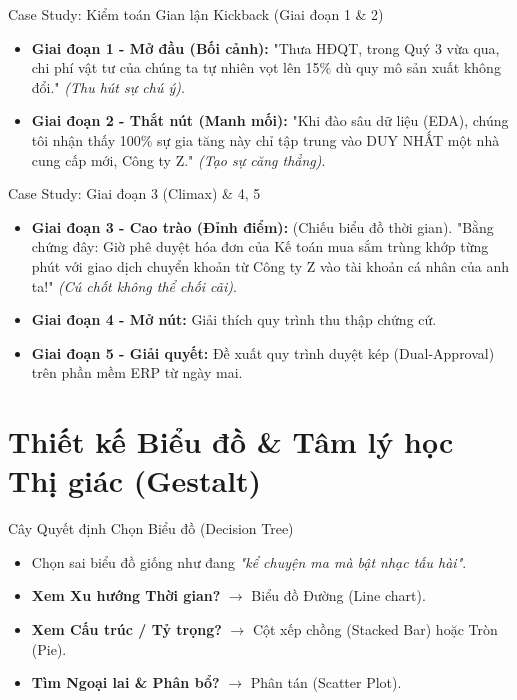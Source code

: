 \documentclass[aspectratio=169,12pt]{beamer}
\begin{document}
\begin{frame}{Case Study: Kiểm toán Gian lận Kickback (Giai đoạn 1 \& 2)}
    \begin{itemize}
        \item \textbf{Giai đoạn 1 - Mở đầu (Bối cảnh):} "Thưa HĐQT, trong Quý 3 vừa qua, chi phí vật tư của chúng ta tự nhiên vọt lên 15\% dù quy mô sản xuất không đổi." \textit{(Thu hút sự chú ý)}.
        \item \textbf{Giai đoạn 2 - Thắt nút (Manh mối):} "Khi đào sâu dữ liệu (EDA), chúng tôi nhận thấy 100\% sự gia tăng này chỉ tập trung vào DUY NHẤT một nhà cung cấp mới, Công ty Z." \textit{(Tạo sự căng thẳng)}.
    \end{itemize}
\end{frame}

\begin{frame}{Case Study: Giai đoạn 3 (Climax) \& 4, 5}
    \begin{itemize}
        \item \textbf{Giai đoạn 3 - Cao trào (Đỉnh điểm):} (Chiếu biểu đồ thời gian). "Bằng chứng đây: Giờ phê duyệt hóa đơn của Kế toán mua sắm trùng khớp từng phút với giao dịch chuyển khoản từ Công ty Z vào tài khoản cá nhân của anh ta!" \textit{(Cú chốt không thể chối cãi)}.
        \item \textbf{Giai đoạn 4 - Mở nút:} Giải thích quy trình thu thập chứng cứ.
        \item \textbf{Giai đoạn 5 - Giải quyết:} Đề xuất quy trình duyệt kép (Dual-Approval) trên phần mềm ERP từ ngày mai.
    \end{itemize}
\end{frame}


\section{Thiết kế Biểu đồ \& Tâm lý học Thị giác (Gestalt)}
\begin{frame}
    \tableofcontents[currentsection]
\end{frame}

\begin{frame}{Cây Quyết định Chọn Biểu đồ (Decision Tree)}
    \begin{itemize}
        \item Chọn sai biểu đồ giống như đang \textit{"kể chuyện ma mà bật nhạc tấu hài"}.
        \item \textbf{Xem Xu hướng Thời gian?} $\rightarrow$ Biểu đồ Đường (Line chart).
        \item \textbf{Xem Cấu trúc / Tỷ trọng?} $\rightarrow$ Cột xếp chồng (Stacked Bar) hoặc Tròn (Pie).
        \item \textbf{Tìm Ngoại lai \& Phân bổ?} $\rightarrow$ Phân tán (Scatter Plot).
    \end{itemize}
\end{frame}
\end{document}
